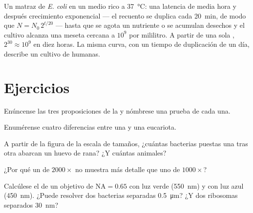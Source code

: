 \begin{example}\label{ex:b1:cell-unit-of-life:growthcurve}
Un matraz de \emph{E. coli} en un medio rico a \qty{37}{\celsius}: una
latencia de media hora y después crecimiento exponencial --- el recuento se
duplica cada \qty{20}{min}, de modo que $N = N_0\,2^{t/20}$ --- hasta que se
agota un nutriente o se acumulan desechos y el cultivo alcanza una meseta
cercana a $10^9$  por mililitro. A partir de una sola ,
$2^{30} \approx 10^9$  en diez horas. La misma curva, con un tiempo
de duplicación de un día, describe un cultivo de  humanas.
\end{example}

\section{Ejercicios}

\begin{exercise}[$\star$]\label{exo:b1:cell-unit-of-life:1}
Enúncense las tres proposiciones de la  y nómbrese una prueba
de cada una.
\end{exercise}

\begin{exercise}[$\star$]\label{exo:b1:cell-unit-of-life:2}
Enumérense cuatro diferencias entre una  y una eucariota.
\end{exercise}

\begin{exercise}[$\star$]\label{exo:b1:cell-unit-of-life:3}
A partir de la figura de la escala de tamaños, ¿cuántas bacterias puestas
una tras otra abarcan un huevo de rana? ¿Y cuántas  animales?
\end{exercise}

\begin{exercise}[$\star$]\label{exo:b1:cell-unit-of-life:4}
¿Por qué un  de $2000\times$ no muestra más detalle que
uno de $1000\times$?
\end{exercise}

\begin{exercise}[$\star\star$]\label{exo:b1:cell-unit-of-life:5}
Calcúlese el  de un objetivo de $\mathrm{NA} = 0.65$ con
luz verde (\qty{550}{nm}) y con luz azul (\qty{450}{nm}). ¿Puede resolver
dos bacterias separadas \qty{0.5}{\micro m}? ¿Y dos ribosomas separados
\qty{30}{nm}?
\end{exercise}

